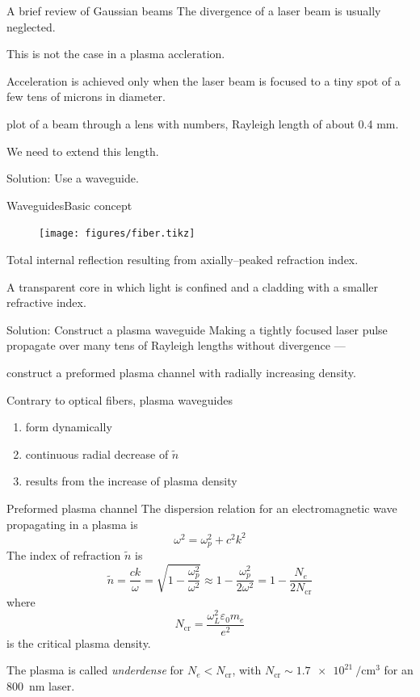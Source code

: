 \documentclass[draft]{beamer}
\begin{document}
  \begin{frame}{A brief review of Gaussian beams}
    The divergence of a laser beam is usually neglected.

    This is not the case in a plasma accleration.
    
    Acceleration is achieved only when the laser beam is focused to a tiny spot of a few tens of microns in diameter.

    \begin{center}
      plot of a beam through a lens with numbers, Rayleigh length of about 0.4 mm.
    \end{center}
    We need to extend this length.

    Solution: Use a waveguide.
  \end{frame}
  \begin{frame}{Waveguides}{Basic concept}
  \begin{figure}
     \texttt{[image: figures/fiber.tikz]}
   \end{figure}
   Total internal reflection resulting from axially--peaked refraction index.

   A transparent core in which light is confined and a cladding with a smaller refractive index.
  \end{frame}
  \begin{frame}{Solution: Construct a plasma waveguide}
    Making a tightly focused laser pulse propagate over many tens of Rayleigh lengths without divergence ---

    construct a preformed plasma channel with radially increasing density.

    Contrary to optical fibers, plasma waveguides
    \begin{enumerate}
      \item form dynamically
      \item continuous radial decrease of $\tilde n$
      \item results from the increase of plasma density
    \end{enumerate}
  \end{frame}
  \begin{frame}{Preformed plasma channel}
  The dispersion relation for an electromagnetic wave propagating in a plasma is
  \begin{equation}
    \omega^2=\omega_p^2+c^2k^2
  \end{equation}
  The index of refraction $\tilde n$ is
  \begin{equation}
    \tilde{n}=\frac{c k}{\omega}=\sqrt{1-\frac{\omega_p^2}{\omega^2}}\approx1-\frac{\omega_p^2}{2\omega^2}=1-\frac{N_e}{2N_\text{cr}}
  \end{equation}
  where
    \begin{equation}
        N_\text{cr}=\frac{\omega_L^2\varepsilon_0 m_e}{e^2}
    \end{equation}
    is the critical plasma density.

    The plasma is called \textit{underdense} for $N_e < N_\text{cr}$, with $N_\text{cr}\sim\SI{1.7e21}{\per\cubic\cm}$ for an \SI{800}{\nm} laser.
\end{frame}
\end{document}

